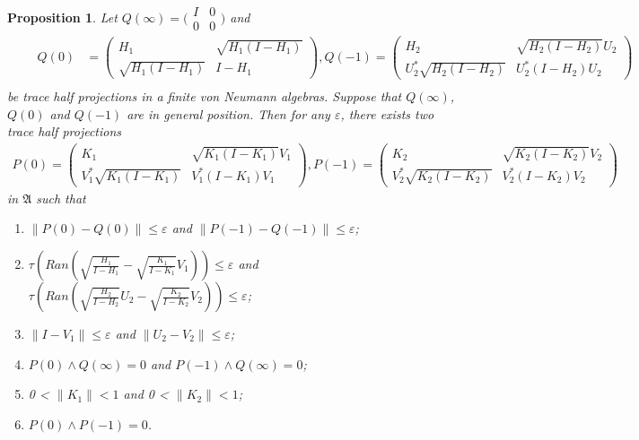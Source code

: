 \documentclass[a4paper,10pt]{amsart}
\newtheorem{proposition}{Proposition}[section]
\newcommand{\AAA}{\mathfrak A}
\begin{document}
\begin{proposition} \label{h_prop1}
    Let $Q(\infty) = \bigl(\begin{smallmatrix}
           I & 0\\
           0 & 0 
   \end{smallmatrix} \bigr)$ and 
   \begin{align*}
       \qquad Q(0) &= \begin{pmatrix}
           H_{1} & \sqrt{H_{1}(I-H_{1})}\\
           \sqrt{H_{1}(I-H_{1})} & I-H_1
        \end{pmatrix},
        Q(-1) = \begin{pmatrix}
            H_{2} & \sqrt{H_{2}(I-H_{2})}U_{2}\\
            U_{2}^{*}\sqrt{H_{2}(I-H_{2})} & U_{2}^{*}(I-H_2)U_{2}
        \end{pmatrix}\\ 
    \end{align*}  
    be trace half projections in a finite von Neumann algebras.
    Suppose that $Q(\infty)$, $Q(0)$ and $Q(-1)$ are in general 
    position.
    Then for any $\varepsilon$, there exists two trace half projections 
    \begin{align*}
        P(0)= \begin{pmatrix}
            K_{1} & \sqrt{K_{1}(I-K_{1})}V_{1}\\
            V^{*}_{1}\sqrt{K_{1}(I-K_{1})} & V^{*}_{1}(I-K_1)V_{1}
        \end{pmatrix},
        P(-1) = \begin{pmatrix}
            K_{2} & \sqrt{K_{2}(I-K_{2})}V_{2}\\
            V_{2}^{*}\sqrt{K_{2}(I-K_{2})} & V_{2}^{*}(I-K_2)V_{2}
        \end{pmatrix}
    \end{align*}
   in $\AAA$ such that 
    \begin{enumerate}
        \item $\|P(0) - Q(0)\| \leq \varepsilon$ and 
            $\|P(-1) - Q(-1)\| \leq \varepsilon$;
   \item $\tau(Ran(\sqrt{\frac{H_1}{I-H_1}} - \sqrt{\frac{K_1}{I-K_1}}V_1)) 
             \leq \varepsilon$ and
    $\tau(Ran(\sqrt{\frac{H_2}{I-H_2}}U_2 - \sqrt{\frac{K_2}{I-K_2}}V_2)) 
             \leq \varepsilon$;
        \item $\|I - V_1\| \leq \varepsilon$ and
            $\|U_2 - V_2\| \leq \varepsilon$;
        \item $P(0) \wedge Q(\infty) = 0$ and $P(-1) \wedge Q(\infty) = 0$;
        \item 0 < $\|K_1\| < 1$ and 
            0 < $\|K_2\| < 1$;
        \item $P(0)\wedge P(-1) = 0$.
   \end{enumerate}
\end{proposition}
\end{document}
